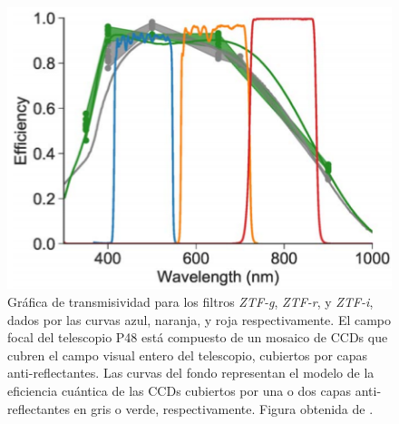 \begin{figure}[!ht]
    \centering
    \includegraphics[scale=0.5]{Muestra/Secciones/Figures/Figura ZTF Pasabandas.png}
    \caption{Gráfica de transmisividad para los filtros \textit{ZTF-g},
    \textit{ZTF-r}, y \textit{ZTF-i}, dados por las curvas azul, naranja, y roja
    respectivamente. El campo focal del telescopio P48 está compuesto de un
    mosaico de CCDs que cubren el campo visual entero del telescopio, cubiertos
    por capas anti-reflectantes. Las curvas del fondo representan el modelo de
    la eficiencia cuántica de las CCDs cubiertos por una o dos capas
    anti-reflectantes en gris o verde, respectivamente. Figura obtenida de
    .}
    \label{figuraZTFPasabandas}
\end{figure}
